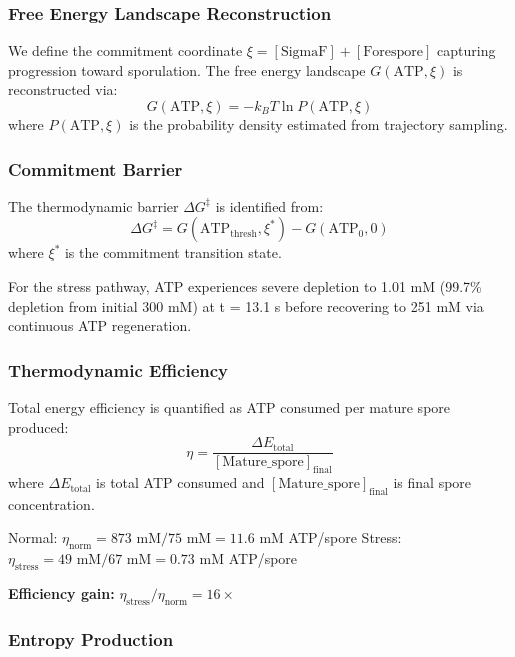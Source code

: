 \documentclass[twocolumn,11pt]{article}
\begin{document}
\subsubsection{Free Energy Landscape Reconstruction}

We define the commitment coordinate $\xi = [\text{SigmaF}] + [\text{Forespore}]$ capturing progression toward sporulation. The free energy landscape $G(\text{ATP}, \xi)$ is reconstructed via:
\begin{equation}
    G(\text{ATP}, \xi) = -k_B T \ln P(\text{ATP}, \xi)
\end{equation}
where $P(\text{ATP}, \xi)$ is the probability density estimated from trajectory sampling.

\subsubsection{Commitment Barrier}

The thermodynamic barrier $\Delta G^\ddagger$ is identified from:
\begin{equation}
    \Delta G^\ddagger = G(\text{ATP}_{\text{thresh}}, \xi^*) - G(\text{ATP}_0, 0)
\end{equation}
where $\xi^*$ is the commitment transition state.

For the stress pathway, ATP experiences severe depletion to 1.01 mM (99.7\% depletion from initial 300 mM) at t = 13.1 s before recovering to 251 mM via continuous ATP regeneration.

\subsubsection{Thermodynamic Efficiency}

Total energy efficiency is quantified as ATP consumed per mature spore produced:
\begin{equation}
    \eta = \frac{\Delta E_{\text{total}}}{[\text{Mature\_spore}]_{\text{final}}}
\end{equation}
where $\Delta E_{\text{total}}$ is total ATP consumed and $[\text{Mature\_spore}]_{\text{final}}$ is final spore concentration.


Normal: $\eta_{\text{norm}} = 873 \text{ mM} / 75 \text{ mM} = 11.6$ mM ATP/spore
Stress: $\eta_{\text{stress}} = 49 \text{ mM} / 67 \text{ mM} = 0.73$ mM ATP/spore


\textbf{Efficiency gain:} $\eta_{\text{stress}} / \eta_{\text{norm}} = 16\times$

\subsubsection{Entropy Production}
\end{document}
